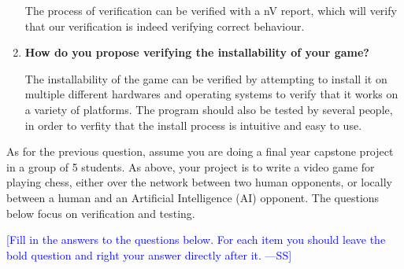 \documentclass[12pt,fleqn]{examtst}
\newcommand{\authornote}[3]{\textcolor{#1}{[#3 ---#2]}}
\newcommand{\authornote}[3]{}
\newcommand{\wss}[1]{\authornote{blue}{SS}{#1}}
\begin{document}
\begin{enumerate}
The process of verification can be verified with a nV report, which will verify that our verification is indeed verifying correct behaviour.
  
\item \textbf{How do you propose verifying the installability of your game?}

The installability of the game can be verified by attempting to install it on multiple different hardwares and operating systems to verify that it works on a variety of platforms. The program should also be tested by several people, in order to verfity that the install process is intuitive and easy to use.
  
\end{enumerate}


\newpage

 As for the previous question, assume you are doing a final
year capstone project in a group of 5 students.  As above, your project
is to write a video game for playing chess, either over the network between two
human opponents, or locally between a human and an Artificial Intelligence
(AI) opponent.  The questions below focus on verification and testing.

\bigskip

\noindent \wss{Fill in the answers to the questions below.  For each item you
  should leave the bold question and right your answer directly after it.}
\end{document}
